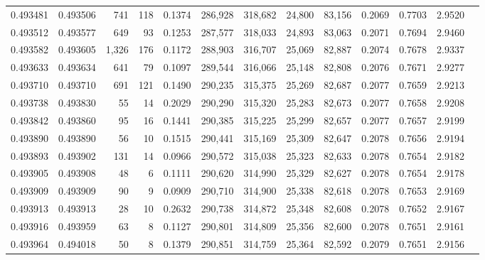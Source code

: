 \begin{tabular}{rrrrrrrrrrrrr}
0.493481 & 0.493506 &   741 &   118 &                                     0.1374 & 286,928 & 318,682 &  24,800 &  83,156 & 0.2069 & 0.7703 & 2.9520 \\
0.493512 & 0.493577 &   649 &    93 &                                     0.1253 & 287,577 & 318,033 &  24,893 &  83,063 & 0.2071 & 0.7694 & 2.9460 \\
0.493582 & 0.493605 & 1,326 &   176 &                                     0.1172 & 288,903 & 316,707 &  25,069 &  82,887 & 0.2074 & 0.7678 & 2.9337 \\
0.493633 & 0.493634 &   641 &    79 &                                     0.1097 & 289,544 & 316,066 &  25,148 &  82,808 & 0.2076 & 0.7671 & 2.9277 \\
0.493710 & 0.493710 &   691 &   121 &                                     0.1490 & 290,235 & 315,375 &  25,269 &  82,687 & 0.2077 & 0.7659 & 2.9213 \\
0.493738 & 0.493830 &    55 &    14 &                                     0.2029 & 290,290 & 315,320 &  25,283 &  82,673 & 0.2077 & 0.7658 & 2.9208 \\
0.493842 & 0.493860 &    95 &    16 &                                     0.1441 & 290,385 & 315,225 &  25,299 &  82,657 & 0.2077 & 0.7657 & 2.9199 \\
0.493890 & 0.493890 &    56 &    10 &                                     0.1515 & 290,441 & 315,169 &  25,309 &  82,647 & 0.2078 & 0.7656 & 2.9194 \\
0.493893 & 0.493902 &   131 &    14 &                                     0.0966 & 290,572 & 315,038 &  25,323 &  82,633 & 0.2078 & 0.7654 & 2.9182 \\
0.493905 & 0.493908 &    48 &     6 &                                     0.1111 & 290,620 & 314,990 &  25,329 &  82,627 & 0.2078 & 0.7654 & 2.9178 \\
0.493909 & 0.493909 &    90 &     9 &                                     0.0909 & 290,710 & 314,900 &  25,338 &  82,618 & 0.2078 & 0.7653 & 2.9169 \\
0.493913 & 0.493913 &    28 &    10 &                                     0.2632 & 290,738 & 314,872 &  25,348 &  82,608 & 0.2078 & 0.7652 & 2.9167 \\
0.493916 & 0.493959 &    63 &     8 &                                     0.1127 & 290,801 & 314,809 &  25,356 &  82,600 & 0.2078 & 0.7651 & 2.9161 \\
0.493964 & 0.494018 &    50 &     8 &                                     0.1379 & 290,851 & 314,759 &  25,364 &  82,592 & 0.2079 & 0.7651 & 2.9156 \\

\end{tabular}
